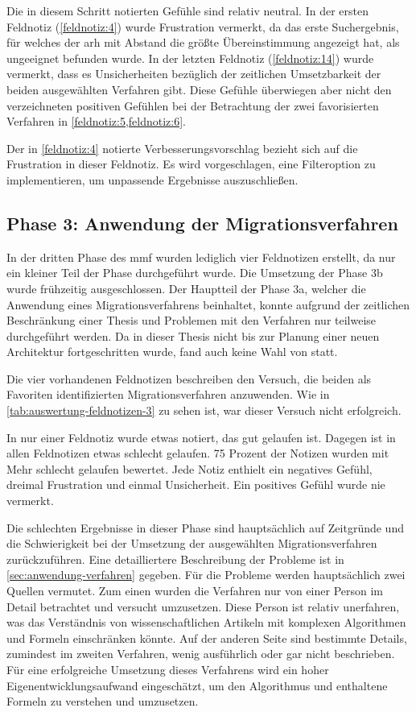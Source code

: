Die in diesem Schritt notierten Gefühle sind relativ neutral.
In der ersten Feldnotiz (\cref{feldnotiz:4}) wurde Frustration vermerkt, da das erste Suchergebnis, für welches der \gls{arh} mit Abstand die größte Übereinstimmung angezeigt hat, als ungeeignet befunden wurde.
In der letzten Feldnotiz (\cref{feldnotiz:14}) wurde vermerkt, dass es Unsicherheiten bezüglich der zeitlichen Umsetzbarkeit der beiden ausgewählten Verfahren gibt.
Diese Gefühle überwiegen aber nicht den verzeichneten positiven Gefühlen bei der Betrachtung der zwei favorisierten Verfahren in \cref{feldnotiz:5,feldnotiz:6}.

Der in \cref{feldnotiz:4} notierte Verbesserungsvorschlag bezieht sich auf die Frustration in dieser Feldnotiz.
Es wird vorgeschlagen, eine Filteroption zu implementieren, um unpassende Ergebnisse auszuschließen.

\subsection{Phase 3: Anwendung der Migrationsverfahren}
\label{sec:feldnotizen-auswertung-phase3}

In der dritten Phase des \gls{mmf} wurden lediglich vier Feldnotizen erstellt, da nur ein kleiner Teil der Phase durchgeführt wurde.
Die Umsetzung der Phase 3b wurde frühzeitig ausgeschlossen.
Der Hauptteil der Phase 3a, welcher die Anwendung eines Migrationsverfahrens beinhaltet, konnte aufgrund der zeitlichen Beschränkung einer Thesis und Problemen mit den Verfahren nur teilweise durchgeführt werden.
Da in dieser Thesis nicht bis zur Planung einer neuen Architektur fortgeschritten wurde, fand auch keine Wahl von \bpp statt.

Die vier vorhandenen Feldnotizen beschreiben den Versuch, die beiden als Favoriten identifizierten Migrationsverfahren anzuwenden.
Wie in \cref{tab:auswertung-feldnotizen-3} zu sehen ist, war dieser Versuch nicht erfolgreich.

In nur einer Feldnotiz wurde etwas notiert, das gut gelaufen ist.
Dagegen ist in allen Feldnotizen etwas schlecht gelaufen.
75 Prozent der Notizen wurden mit \glqq Mehr schlecht gelaufen\grqq{} bewertet.
Jede Notiz enthielt ein negatives Gefühl, dreimal Frustration und einmal Unsicherheit.
Ein positives Gefühl wurde nie vermerkt.

Die schlechten Ergebnisse in dieser Phase sind hauptsächlich auf Zeitgründe und die Schwierigkeit bei der Umsetzung der ausgewählten Migrationsverfahren zurückzuführen.
Eine detailliertere Beschreibung der Probleme ist in \cref{sec:anwendung-verfahren} gegeben.
Für die Probleme werden hauptsächlich zwei Quellen vermutet.
Zum einen wurden die Verfahren nur von einer Person im Detail betrachtet und versucht umzusetzen.
Diese Person ist relativ unerfahren, was das Verständnis von wissenschaftlichen Artikeln mit komplexen Algorithmen und Formeln einschränken könnte.
Auf der anderen Seite sind bestimmte Details, zumindest im zweiten Verfahren, wenig ausführlich oder gar nicht beschrieben.
Für eine erfolgreiche Umsetzung dieses Verfahrens wird ein hoher Eigenentwicklungsaufwand eingeschätzt, um den Algorithmus und enthaltene Formeln zu verstehen und umzusetzen.


